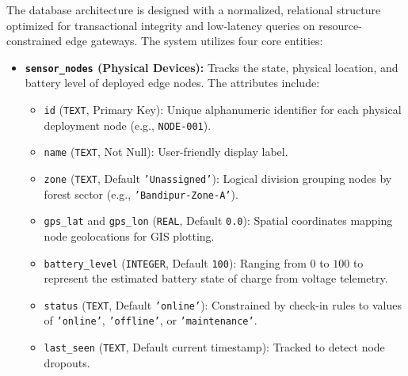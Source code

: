 \documentclass[11pt,a4paper,oneside]{report}
\begin{document}
The database architecture is designed with a normalized, relational structure optimized for transactional integrity and low-latency queries on resource-constrained edge gateways. The system utilizes four core entities:
\begin{itemize}
    \item \textbf{\texttt{sensor\_nodes} (Physical Devices):} Tracks the state, physical location, and battery level of deployed edge nodes. The attributes include:
    \begin{itemize}
        \item \texttt{id} (\texttt{TEXT}, Primary Key): Unique alphanumeric identifier for each physical deployment node (e.g., \texttt{NODE-001}).
        \item \texttt{name} (\texttt{TEXT}, Not Null): User-friendly display label.
        \item \texttt{zone} (\texttt{TEXT}, Default \texttt{'Unassigned'}): Logical division grouping nodes by forest sector (e.g., \texttt{'Bandipur-Zone-A'}).
        \item \texttt{gps\_lat} and \texttt{gps\_lon} (\texttt{REAL}, Default \texttt{0.0}): Spatial coordinates mapping node geolocations for GIS plotting.
        \item \texttt{battery\_level} (\texttt{INTEGER}, Default \texttt{100}): Ranging from $0$ to $100$ to represent the estimated battery state of charge from voltage telemetry.
        \item \texttt{status} (\texttt{TEXT}, Default \texttt{'online'}): Constrained by check-in rules to values of \texttt{'online'}, \texttt{'offline'}, or \texttt{'maintenance'}.
        \item \texttt{last\_seen} (\texttt{TEXT}, Default current timestamp): Tracked to detect node dropouts.
    \end{itemize}
    

\end{itemize}
\end{document}

